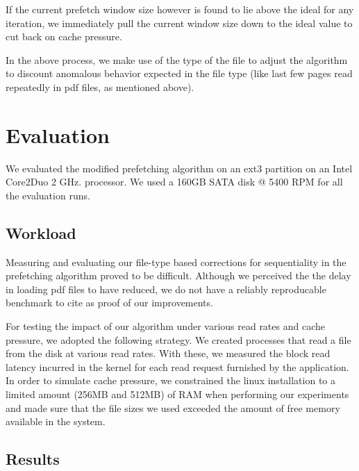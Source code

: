 \documentclass[twocolumn,10pt]{article}
\begin{document}
If the current prefetch window size however is found to lie above the ideal for any
iteration, we immediately pull the current window size down to the ideal value to cut
back on cache pressure.

In the above process, we make use of the type of the file to adjust the algorithm 
to discount anomalous behavior expected in the file type (like last few pages read 
repeatedly in pdf files, as mentioned above).

\section{Evaluation}

We evaluated the modified prefetching algorithm on an ext3 partition on an
Intel Core2Duo 2 GHz. processor. We used a 160GB SATA disk @ 5400 RPM for 
all the evaluation runs.

\subsection{Workload}

Measuring and evaluating our file-type based corrections for sequentiality in the prefetching algorithm proved to be difficult.  Although we perceived the the delay in loading pdf files to have reduced, we do not have a reliably reproducable benchmark to cite as proof of our improvements.

For testing the impact of our algorithm under various read rates and cache pressure, we adopted the following strategy. We created processes that read a file from the disk at various read rates. With these, we measured the block read latency incurred in the kernel for each read request furnished by the application. In order to simulate cache pressure, we constrained the linux installation to a limited amount (256MB and 512MB) of RAM when performing our experiments and made sure that the file sizes we used exceeded the amount of free memory available in the system.

\subsection{Results}
\end{document}
